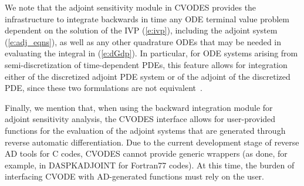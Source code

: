 We note that the adjoint sensitivity module in CVODES provides the 
infrastructure to integrate backwards in time any ODE terminal value problem
dependent on the solution of the IVP (\ref{e:ivp}), including
the adjoint system (\ref{e:adj_eqns}), as well as any other
quadrature ODEs that may be needed in evaluating the integral in (\ref{e:dGdp}).
In particular, for ODE systems arising from semi-discretization
of time-dependent PDEs, this feature allows for integration either of the 
discretized adjoint PDE system or of the adjoint of the discretized PDE,
since these two formulations are not equivalent~\cite{ArSa:97,LiPe:04}.

Finally, we mention that, when using the backward integration module for adjoint
sensitivity analysis, the CVODES interface allows for user-provided
functions for the evaluation of the adjoint systems that are generated through
reverse automatic differentiation. Due to the current development stage of
reverse AD tools for C codes, CVODES cannot provide generic wrappers
(as done, for example, in DASPKADJOINT for Fortran77 codes). At this time, the
burden of interfacing CVODE with AD-generated functions must rely on
the user.
